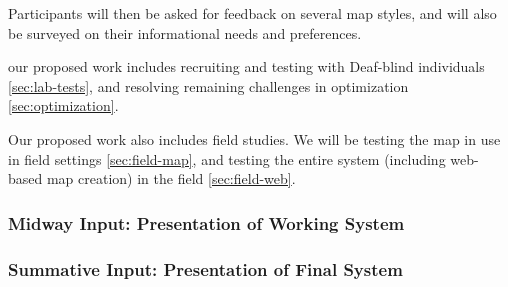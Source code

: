 Participants will then be asked for feedback on several map styles, and will also be surveyed on their informational needs and preferences.  


our proposed work includes recruiting and testing with Deaf-blind individuals \ref{sec:lab-tests}, and resolving remaining challenges in optimization \ref{sec:optimization}.
\item[Testing in Natural Contexts (Proof of product)] Our proposed work also includes field studies. We will be testing the map in use in field settings \ref{sec:field-map}, and testing the entire system (including web-based map creation) in the field \ref{sec:field-web}. 


\subsubsection{Midway Input: Presentation of Working System}


\subsubsection{Summative Input: Presentation of Final System}

